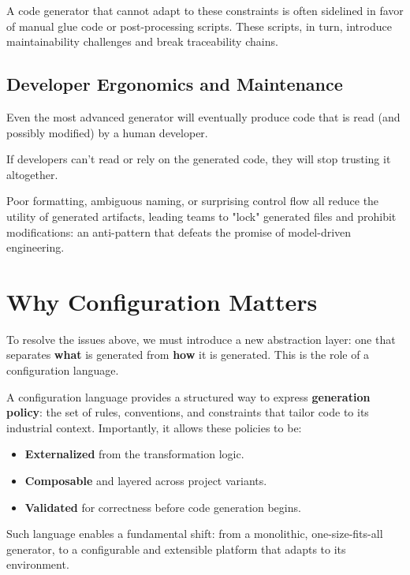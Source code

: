 A code generator that cannot adapt to these constraints is often sidelined in favor of manual glue code or post-processing scripts. These scripts, in turn, introduce maintainability challenges and break traceability chains.

\subsection*{Developer Ergonomics and Maintenance}

Even the most advanced generator will eventually produce code that is read (and possibly modified) by a human developer. 

\begin{tcolorbox}[colback=green!8]
	If developers can't read or rely on the generated code, they will stop trusting it altogether.
\end{tcolorbox}

Poor formatting, ambiguous naming, or surprising control flow all reduce the utility of generated artifacts, leading teams to "lock" generated files and prohibit modifications: an anti-pattern that defeats the promise of model-driven engineering.

\section{Why Configuration Matters}
\label{sec:why_configuration_matters}

To resolve the issues above, we must introduce a new abstraction layer: one that separates \textbf{what} is generated from \textbf{how} it is generated. This is the role of a configuration language.

A configuration language provides a structured way to express \textbf{generation policy}: the set of rules, conventions, and constraints that tailor code to its industrial context. Importantly, it allows these policies to be:

\begin{itemize}
	\item \textbf{Externalized} from the transformation logic.
	\item \textbf{Composable} and layered across project variants.
	\item \textbf{Validated} for correctness before code generation begins.
\end{itemize}

Such language enables a fundamental shift: from a monolithic, one-size-fits-all generator, to a configurable and extensible platform that adapts to its environment.

